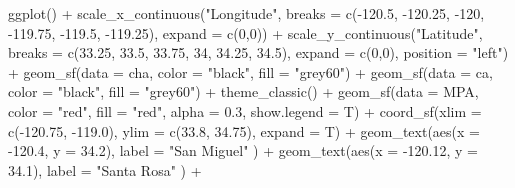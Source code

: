 \documentclass[
]{article}
\newenvironment{Shaded}{\begin{snugshade}}{\end{snugshade}}
\newcommand{\AttributeTok}[1]{\textcolor[rgb]{0.77,0.63,0.00}{#1}}
\newcommand{\DecValTok}[1]{\textcolor[rgb]{0.00,0.00,0.81}{#1}}
\newcommand{\FloatTok}[1]{\textcolor[rgb]{0.00,0.00,0.81}{#1}}
\newcommand{\FunctionTok}[1]{\textcolor[rgb]{0.00,0.00,0.00}{#1}}
\newcommand{\NormalTok}[1]{#1}
\newcommand{\SpecialCharTok}[1]{\textcolor[rgb]{0.00,0.00,0.00}{#1}}
\newcommand{\StringTok}[1]{\textcolor[rgb]{0.31,0.60,0.02}{#1}}
\begin{document}
\begin{Shaded}
\begin{Highlighting}[]
\FunctionTok{ggplot}\NormalTok{() }\SpecialCharTok{+}
  \FunctionTok{scale\_x\_continuous}\NormalTok{(}\StringTok{"Longitude"}\NormalTok{, }\AttributeTok{breaks =} \FunctionTok{c}\NormalTok{(}\SpecialCharTok{{-}}\FloatTok{120.5}\NormalTok{, }\SpecialCharTok{{-}}\FloatTok{120.25}\NormalTok{, }\SpecialCharTok{{-}}\DecValTok{120}\NormalTok{, }\SpecialCharTok{{-}}\FloatTok{119.75}\NormalTok{, }\SpecialCharTok{{-}}\FloatTok{119.5}\NormalTok{, }\SpecialCharTok{{-}}\FloatTok{119.25}\NormalTok{),}
                     \AttributeTok{expand =} \FunctionTok{c}\NormalTok{(}\DecValTok{0}\NormalTok{,}\DecValTok{0}\NormalTok{)) }\SpecialCharTok{+}
  \FunctionTok{scale\_y\_continuous}\NormalTok{(}\StringTok{"Latitude"}\NormalTok{, }\AttributeTok{breaks =} \FunctionTok{c}\NormalTok{(}\FloatTok{33.25}\NormalTok{, }\FloatTok{33.5}\NormalTok{, }\FloatTok{33.75}\NormalTok{, }\DecValTok{34}\NormalTok{, }\FloatTok{34.25}\NormalTok{, }\FloatTok{34.5}\NormalTok{),}
                                \AttributeTok{expand =} \FunctionTok{c}\NormalTok{(}\DecValTok{0}\NormalTok{,}\DecValTok{0}\NormalTok{),}
                     \AttributeTok{position =} \StringTok{"left"}\NormalTok{) }\SpecialCharTok{+}
  \FunctionTok{geom\_sf}\NormalTok{(}\AttributeTok{data =}\NormalTok{ cha, }\AttributeTok{color =} \StringTok{"black"}\NormalTok{, }\AttributeTok{fill =} \StringTok{"grey60"}\NormalTok{) }\SpecialCharTok{+}
  \FunctionTok{geom\_sf}\NormalTok{(}\AttributeTok{data =}\NormalTok{ ca, }\AttributeTok{color =} \StringTok{"black"}\NormalTok{, }\AttributeTok{fill =} \StringTok{"grey60"}\NormalTok{) }\SpecialCharTok{+}
  \FunctionTok{theme\_classic}\NormalTok{() }\SpecialCharTok{+}
  \FunctionTok{geom\_sf}\NormalTok{(}\AttributeTok{data =}\NormalTok{ MPA, }\AttributeTok{color =} \StringTok{"red"}\NormalTok{, }\AttributeTok{fill =} \StringTok{"red"}\NormalTok{, }\AttributeTok{alpha =} \FloatTok{0.3}\NormalTok{, }\AttributeTok{show.legend =}\NormalTok{ T) }\SpecialCharTok{+}
  \FunctionTok{coord\_sf}\NormalTok{(}\AttributeTok{xlim =} \FunctionTok{c}\NormalTok{(}\SpecialCharTok{{-}}\FloatTok{120.75}\NormalTok{, }\SpecialCharTok{{-}}\FloatTok{119.0}\NormalTok{), }\AttributeTok{ylim =} \FunctionTok{c}\NormalTok{(}\FloatTok{33.8}\NormalTok{, }\FloatTok{34.75}\NormalTok{), }\AttributeTok{expand =}\NormalTok{ T) }\SpecialCharTok{+}
  \FunctionTok{geom\_text}\NormalTok{(}\FunctionTok{aes}\NormalTok{(}\AttributeTok{x =} \SpecialCharTok{{-}}\FloatTok{120.4}\NormalTok{, }\AttributeTok{y =} \FloatTok{34.2}\NormalTok{),  }\AttributeTok{label =} \StringTok{"San Miguel"}\NormalTok{ ) }\SpecialCharTok{+}
  \FunctionTok{geom\_text}\NormalTok{(}\FunctionTok{aes}\NormalTok{(}\AttributeTok{x =} \SpecialCharTok{{-}}\FloatTok{120.12}\NormalTok{, }\AttributeTok{y =} \FloatTok{34.1}\NormalTok{),  }\AttributeTok{label =} \StringTok{"Santa Rosa"}\NormalTok{ ) }\SpecialCharTok{+}

\end{Highlighting}
\end{Shaded}
\end{document}
